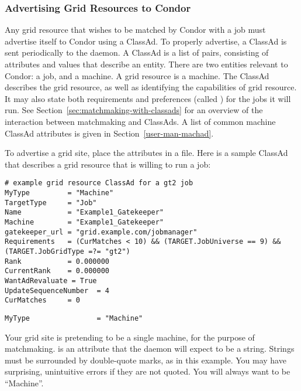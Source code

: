 \subsubsection{Advertising Grid Resources to Condor}

Any grid resource that wishes to be matched by Condor with
a job must advertise itself to Condor using a ClassAd.
To properly advertise, a ClassAd is sent
periodically to the  daemon.
A ClassAd is a list of pairs, consisting of
attributes and values that describe an entity.
There are two entities relevant to Condor:
a job, and a machine.
A grid resource is a machine.
The ClassAd describes the grid resource, as well
as identifying the capabilities of grid resource.
It may also state both requirements and preferences
(called ) for the jobs it will run.
See
Section~\ref{sec:matchmaking-with-classads} for an overview
of the interaction between matchmaking and ClassAds.
A list of common machine ClassAd attributes is given in
Section~\ref{user-man-machad}.

To advertise a grid site, place the attributes
in a file.
Here is a sample ClassAd that describes a grid resource
that is willing to run a
  job:

\footnotesize
\begin{verbatim}
# example grid resource ClassAd for a gt2 job
MyType         = "Machine"
TargetType     = "Job"
Name           = "Example1_Gatekeeper"
Machine        = "Example1_Gatekeeper"
gatekeeper_url = "grid.example.com/jobmanager"
Requirements   = (CurMatches < 10) && (TARGET.JobUniverse == 9) && (TARGET.JobGridType =?= "gt2")
Rank           = 0.000000
CurrentRank    = 0.000000
WantAdRevaluate = True
UpdateSequenceNumber  = 4
CurMatches     = 0
\end{verbatim}
\normalsize


\begin{verbatim}
MyType                = "Machine"
\end{verbatim}

Your grid site is pretending to be a single machine, for the purpose
of matchmaking.  is an attribute that the 
daemon
will expect to be a string. Strings must be surrounded by double-quote
marks, as in this example. You may have surprising, unintuitive errors
if they are not quoted. You will always want  to be
``Machine''. 

